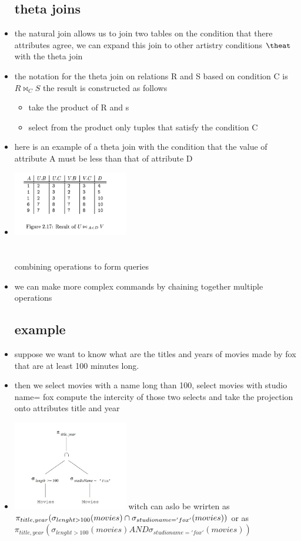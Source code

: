 \documentclass{article}
\begin{document}
\begin{itemize}
\subsection{theta joins}
\item the natural join allows us to join two tables on the condition that there attributes agree, we can expand this join to other artistry conditions $\theat$ with the theta join
\item the notation for the theta join on relations R and S based on condition C is $R\bowtie_{C}S$ the result is constructed as follows
\begin{itemize}
    \item take the product of R and s 
    \item select from the product only tuples that satisfy the condition C
\end{itemize}
\item here is an example of a theta join with the condition that the value of attribute A must be less than that of attribute D
\item \includegraphics[width=5cm]{reading assignment notes/week 1/database systems the complete book chapter 2/natural_join_2.jpg}

\section{}{combining operations to form queries}
\item we can make more complex commands by chaining together multiple operations 
\subsection{example}
\item suppose we want to know what are the titles and years of movies made by fox that are at least 100 minutes long. 
\item then we select movies with a name long than 100, select movies with studio name= fox compute the intercity of those two selects and take the projection onto attributes title and year
\item \includegraphics[width=5cm]{reading assignment notes/week 1/database systems the complete book chapter 2/relational_algebra_1.jpg}
witch can aslo be wrirten as \\$\pi_{title,year}(\sigma_{lenght>100}(movies) \cap \sigma_{studioname='fox'}(movies))\\$ or as $\pi_{title,year}(\sigma_{lenght>100}(movies) AND \sigma_{studioname='fox'}(movies))$

\end{itemize}
\end{document}
